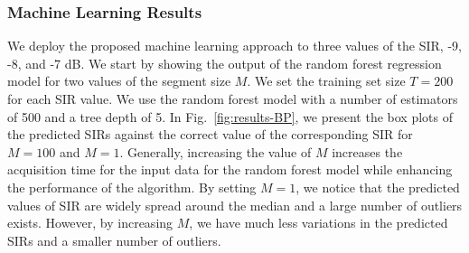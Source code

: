 \subsubsection{Machine Learning Results}\label{ftml-conf:sec:results-ML}
We deploy the proposed machine learning approach to three values of the SIR, -9, -8, and -7 dB. We start by showing the output of the random forest regression model for two values of the segment size $M$. We set the training set size $T=200$ for each SIR value. We use the random forest model with a number of estimators of 500 and a tree depth of 5. In Fig.~\ref{fig:results-BP}, we present the box plots of the predicted SIRs against the correct value of the corresponding SIR for $M=100$ and $M=1$.  Generally, increasing the value of $M$ increases the acquisition time for the input data for the random forest model while enhancing the performance of the algorithm. By setting $M=1$, we notice that the predicted values of SIR are widely spread around the median and a large number of outliers exists. However, by increasing $M$, we have much less variations in the predicted SIRs and a smaller number of outliers.



